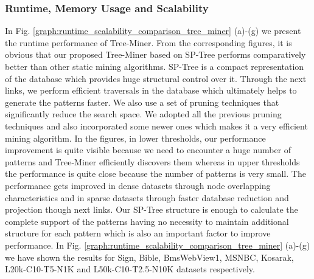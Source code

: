 \subsubsection{Runtime, Memory Usage and Scalability}
In Fig. \ref{graph:runtime_scalability_comparison_tree_miner} (a)-(g) we present the runtime performance of Tree-Miner. From the corresponding figures, it is obvious that our proposed Tree-Miner based on SP-Tree performs comparatively better than other static mining algorithms. SP-Tree is a compact representation of the database which provides huge structural control over it. Through the next links, we perform efficient traversals in the database which ultimately helps to generate the patterns faster. We also use a set of pruning techniques that significantly reduce the search space. We adopted all the previous pruning techniques and also incorporated some newer ones which makes it a very efficient mining algorithm. In the figures, in lower thresholds, our performance improvement is quite visible because we need to encounter a huge number of patterns and Tree-Miner efficiently discovers them whereas in upper thresholds the performance is quite close because the number of patterns is very small. The performance gets improved in dense datasets through node overlapping characteristics and in sparse datasets through faster database reduction and projection though next links. Our SP-Tree structure is enough to calculate the complete support of the patterns having no necessity to maintain additional structure for each pattern which is also an important factor to improve performance. In Fig. \ref{graph:runtime_scalability_comparison_tree_miner} (a)-(g) we have shown the results for Sign, Bible, BmsWebView1, MSNBC, Kosarak, L20k-C10-T5-N1K and L50k-C10-T2.5-N10K datasets respectively.


